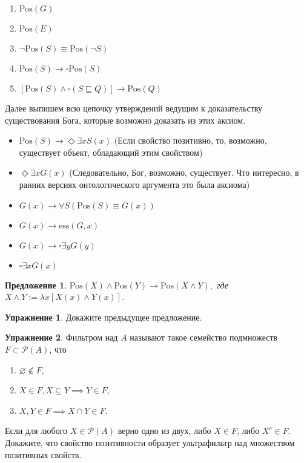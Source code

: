 \documentclass[openany]{book}
\theoremstyle{plain}
\newtheorem{prop}[thm]{Предложение}
\theoremstyle{definition}
\newtheorem{xrc}{Упражнение}[]
\begin{document}
\begin{enumerate}
    \item \(\mathrm{Pos}(G)\)

    \item \(\mathrm{Pos}(E)\)

    \item \(\neg \mathrm{Pos}(S) \equiv \mathrm{Pos}(\neg S)\)
    \item \(\mathrm{Pos}(S) \to \square \mathrm{Pos}(S)\)
    \item \([\mathrm{Pos}(S) \land \square (S \sqsubseteq Q)] \to \mathrm{Pos}(Q)\)
\end{enumerate}

Далее выпишем всю цепочку утверждений ведущим к доказательству существования Бога, которые возможно доказать из этих аксиом.

\begin{itemize}
    \item \(\mathrm{Pos}(S) \to \Diamond \exists x S(x)\) (Если свойство позитивно, то, возможно, существует объект, обладающий этим свойством)
    \item \(\Diamond \exists x G(x)\) (Следовательно, Бог, возможно, существует. Что интересно, в ранних версиях онтологического аргумента это была аксиома)
    \item \(G(x) \to \forall S (\mathrm{Pos}(S) \equiv G(x))\)
    \item \(G(x) \to \mathrm{ess}(G, x)\)
    \item \(G(x) \to \square \exists y G(y)\) 
    \item \(\square \exists x G(x)\)
\end{itemize}

\begin{prop}
    \(\mathrm{Pos}(X) \land \mathrm{Pos}(Y) \to \mathrm{Pos}(X \land Y),\) где \(X \land Y := \lambda x [X(x) \land Y(x)]\).
\end{prop}

\begin{xrc}
    Докажите предыдущее предложение.
\end{xrc}

\begin{xrc}
    Фильтром над \(A\) называют такое семейство подмножеств \(F \subset \mathcal{P}(A)\), что
    \begin{enumerate}
	\item \(\varnothing \not\in F\),
	\item \(X \in F, X \subseteq Y \implies Y \in F\),
	\item \(X, Y \in F \implies X \cap Y \in F\).
    \end{enumerate}
    Если для любого \(X \in \mathcal{P}(A)\) верно одно из двух, либо \(X \in F\), либо \(X^c \in F\).
    Докажите, что свойство позитивности образует ультрафильтр над множеством позитивных свойств.
\end{xrc}
\end{document}
